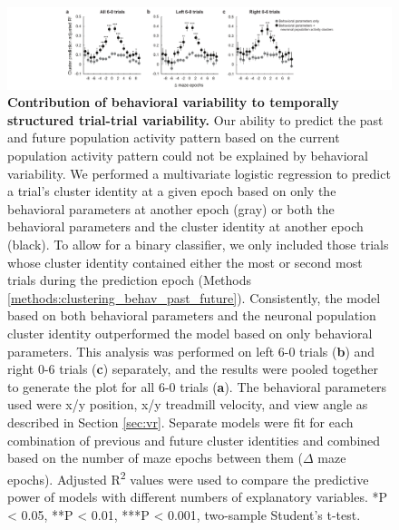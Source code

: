 \begin{figure}
\includegraphics[width=1.4\textwidth,center]{figures/fig_3_11.pdf}
\caption[Contribution of behavioral variability to temporally structured trial-trial variability.]
{\textbf{Contribution of behavioral variability to temporally structured trial-trial variability.}  Our ability to predict the past and future population activity pattern based on the current population activity pattern could not be explained by behavioral variability. We performed a multivariate logistic regression to predict a trial's cluster identity at a given epoch based on only the behavioral parameters at another epoch (gray) or both the behavioral parameters and the cluster identity at another epoch (black). To allow for a binary classifier, we only included those trials whose cluster identity contained either the most or second most trials during the prediction epoch (Methods \ref{methods:clustering_behav_past_future}). Consistently, the model based on both behavioral parameters and the neuronal population cluster identity outperformed the model based on only behavioral parameters. This analysis was performed on left 6-0 trials (\textbf{b}) and right 0-6 trials (\textbf{c}) separately, and the results were pooled together to generate the plot for all 6-0 trials (\textbf{a}). The behavioral parameters used were x/y position, x/y treadmill velocity, and view angle as described in Section \ref{sec:vr}.  Separate models were fit for each combination of previous and future cluster identities and combined based on the number of maze epochs between them ($\Delta$ maze epochs). Adjusted R\textsuperscript{2} values were used to compare the predictive power of models with different numbers of explanatory variables. *P < 0.05, **P < 0.01, ***P < 0.001, two-sample Student's t-test.
\label{fig:3_11}}
\end{figure} 


